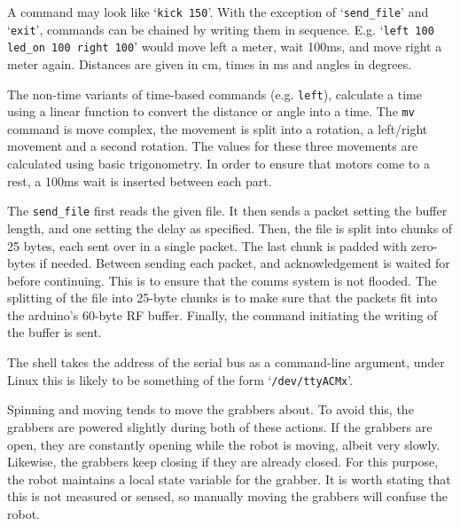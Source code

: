 \documentclass[a4paper]{scrartcl}
\begin{document}
A command may look like `\verb$kick 150$'. With the exception of
`\verb$send_file$' and `\verb$exit$', commands can be chained by writing them
in sequence. E.g.  `\texttt{left 100 led\_on 100 right 100}' would move left a
meter, wait 100ms, and move right a meter again. Distances are given in cm,
times in ms and angles in degrees.

The non-time variants of time-based commands (e.g. \verb$left$), calculate a
time using a linear function to convert the distance or angle into a time. The
\verb$mv$ command is move complex, the movement is split into a rotation, a
left/right movement and a second rotation. The values for these three movements
are calculated using basic trigonometry. In order to ensure that motors come to
a rest, a 100ms wait is inserted between each part.

The \verb$send_file$ first reads the given file. It then sends a packet setting
the buffer length, and one setting the delay as specified. Then, the file is
split into chunks of 25 bytes, each sent over in a single packet. The last
chunk is padded with zero-bytes if needed. Between sending each packet, and
acknowledgement is waited for before continuing. This is to ensure that the
comms system is not flooded. The splitting of the file into 25-byte chunks is
to make sure that the packets fit into the arduino's 60-byte RF buffer.
Finally, the command initiating the writing of the buffer is sent.

The shell takes the address of the serial bus as a command-line argument, under
Linux this is likely to be something of the form `\verb$/dev/ttyACMx$'.



Spinning and moving tends to move the grabbers about. To avoid this, the
grabbers are powered slightly during both of these actions. If the grabbers are
open, they are constantly opening while the robot is moving, albeit very
slowly. Likewise, the grabbers keep closing if they are already closed. For
this purpose, the robot maintains a local state variable for the grabber. It is
worth stating that this is not measured or sensed, so manually moving the
grabbers will confuse the robot.
\end{document}
